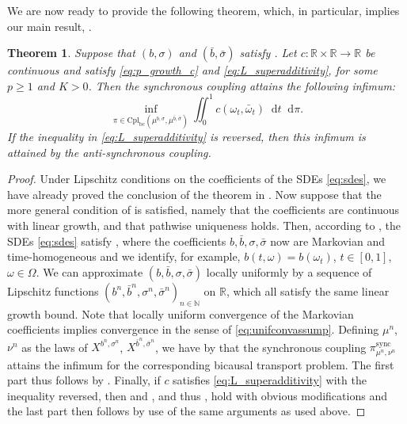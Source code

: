 \documentclass[oneside]{amsart}
\newtheorem{theorem}{Theorem}[section]
\theoremstyle{definition}
\newcommand{\N}{\mathbb N}
\newcommand{\R}{\mathbb R}
\newcommand{\cplbc}{\mathrm{Cpl}_{\mathrm{bc}}}
\newcommand{\sync}{\mathrm{sync}}
\newcommand{\dt}{\mathop{}\!\mathrm{d}t}
\newcommand{\di}{\mathop{}\!\mathrm{d}}
\def\R{{\mathbb R}}
\numberwithin{equation}{section}
\begin{document}
We are now ready to provide the following theorem, which, in particular, implies our main result, .

	\begin{theorem}\label{thm:optimality_general_c}
		Suppose that $(b, \sigma)$ and $(\bar b, \bar \sigma)$ satisfy .
		Let $c \colon \mathbb R\times \mathbb R \to\mathbb R$ be continuous and satisfy \eqref{eq:p_growth_c} and \eqref{eq:L_superadditivity}, for some $p \ge 1$ and $K>0$. 
		Then the synchronous coupling attains the following infimum:
		\[
\inf_{\pi\in\cplbc(\mu^{b,\sigma},\mu^{\bar b,\bar\sigma})}\iint_0^1c\!\left(\omega_t,\bar{\omega}_t\right)\dt\di\pi.
\]
	If the inequality in \eqref{eq:L_superadditivity} is reversed, then this infimum is attained by the anti-synchronous coupling. 
	\end{theorem}	
	
\begin{proof}
	Under Lipschitz conditions on the coefficients of the SDEs \eqref{eq:sdes}, we have already proved the conclusion of the theorem in . Now suppose that the more general condition of  is satisfied, namely that the coefficients are continuous with linear growth, and that pathwise uniqueness holds. Then, according to , the SDEs \eqref{eq:sdes} satisfy , where the coefficients $b, \bar{b}, \sigma, \bar{\sigma}$ now are Markovian and time-homogeneous and we identify, for example, $b(t, \omega) = b(\omega_t)$, $t \in [0, 1]$, $\omega \in \Omega$. We can approximate $(b, \bar{b}, \sigma, \bar{\sigma})$ locally uniformly by a sequence of Lipschitz functions $(b^n, \bar{b}^n, \sigma^n, \bar{\sigma}^n)_{n \in \N}$ on $\R$, which all satisfy the same linear growth bound. Note that locally uniform convergence of the Markovian coefficients implies convergence in the sense of \eqref{eq:unifconvassump}. Defining $\mu^n$, $\nu^n$ as the laws of $X^{b^n, \sigma^n}$, $X^{\bar b^n, \bar \sigma^n}$, we have by  that the synchronous coupling $\pi^\sync_{\mu^n, \nu^n}$ attains the infimum for the corresponding bicausal transport problem. The first part thus follows by .
	Finally, if $c$ satisfies \eqref{eq:L_superadditivity} with the inequality reversed, then  and , and thus , hold with obvious modifications and the last part then follows by use of the same arguments as used above. 
\end{proof}
\end{document}

